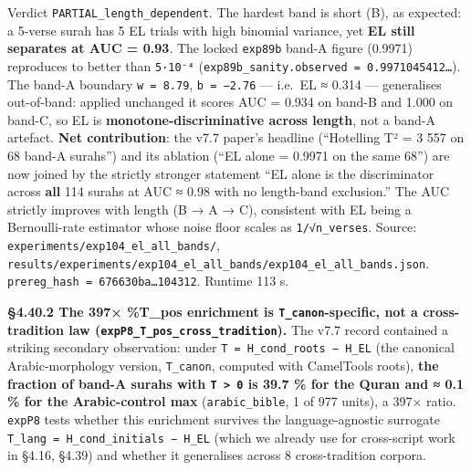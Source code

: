 \documentclass[
]{article}
\begin{document}
Verdict \texttt{PARTIAL\_length\_dependent}. The hardest band is short
(B), as expected: a 5-verse surah has 5 EL trials with high binomial
variance, yet \textbf{EL still separates at AUC = 0.93}. The locked
\texttt{exp89b} band-A figure (0.9971) reproduces to better than
\texttt{5·10⁻⁴} (\texttt{exp89b\_sanity.observed\ =\ 0.9971045412…}).
The band-A boundary \texttt{w\ =\ 8.79}, \texttt{b\ =\ −2.76} ---
i.e.~EL ≈ 0.314 --- generalises out-of-band: applied unchanged it scores
AUC = 0.934 on band-B and 1.000 on band-C, so EL is
\textbf{monotone-discriminative across length}, not a band-A artefact.
\textbf{Net contribution}: the v7.7 paper's headline (``Hotelling T² = 3
557 on 68 band-A surahs'') and its ablation (``EL alone = 0.9971 on the
same 68'') are now joined by the strictly stronger statement ``EL alone
is the discriminator across \textbf{all} 114 surahs at AUC ≈ 0.98 with
no length-band exclusion.'' The AUC strictly improves with length (B → A
→ C), consistent with EL being a Bernoulli-rate estimator whose noise
floor scales as \texttt{1/√n\_verses}. Source:
\texttt{experiments/exp104\_el\_all\_bands/},
\texttt{results/experiments/exp104\_el\_all\_bands/exp104\_el\_all\_bands.json}.
\texttt{prereg\_hash\ =\ 676630ba…104312}. Runtime 113 s.

\textbf{§4.40.2 The 397× \%T\_pos enrichment is
\texttt{T\_canon}-specific, not a cross-tradition law
(\texttt{expP8\_T\_pos\_cross\_tradition}).} The v7.7 record contained a
striking secondary observation: under
\texttt{T\ =\ H\_cond\_roots\ −\ H\_EL} (the canonical Arabic-morphology
version, \texttt{T\_canon}, computed with CamelTools roots), \textbf{the
fraction of band-A surahs with \texttt{T\ \textgreater{}\ 0} is 39.7 \%
for the Quran and ≈ 0.1 \% for the Arabic-control max}
(\texttt{arabic\_bible}, 1 of 977 units), a 397× ratio. \texttt{expP8}
tests whether this enrichment survives the language-agnostic surrogate
\texttt{T\_lang\ =\ H\_cond\_initials\ −\ H\_EL} (which we already use
for cross-script work in §4.16, §4.39) and whether it generalises across
8 cross-tradition corpora.
\end{document}
